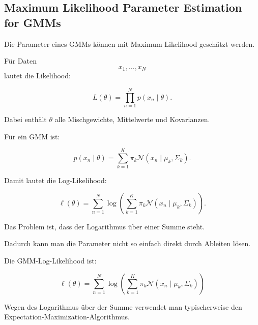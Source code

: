 \documentclass[11pt,a4paper]{scrartcl}
\begin{document}
\subsection{Maximum Likelihood Parameter Estimation for GMMs}

\begin{notebox}
    Die Parameter eines GMMs können mit Maximum Likelihood geschätzt werden.

    Für Daten
    \[
        x_1,\dots,x_N
    \]
    lautet die Likelihood:

    \[
        L(\theta)
        =
        \prod_{n=1}^{N}
        p(x_n\mid \theta).
    \]

    Dabei enthält \(\theta\) alle Mischgewichte, Mittelwerte und Kovarianzen.
\end{notebox}

\begin{calculationbox}
    Für ein GMM ist:

    \[
        p(x_n\mid \theta)
        =
        \sum_{k=1}^{K}
        \pi_k
        \mathcal{N}(x_n\mid \mu_k,\Sigma_k).
    \]

    Damit lautet die Log-Likelihood:

    \[
        \ell(\theta)
        =
        \sum_{n=1}^{N}
        \log
        \left(
            \sum_{k=1}^{K}
            \pi_k
            \mathcal{N}(x_n\mid \mu_k,\Sigma_k)
        \right).
    \]

    Das Problem ist, dass der Logarithmus über einer Summe steht.

    Dadurch kann man die Parameter nicht so einfach direkt durch Ableiten lösen.
\end{calculationbox}

\begin{answerbox}
    Die GMM-Log-Likelihood ist:

    \[
        \boxed{
            \ell(\theta)
            =
            \sum_{n=1}^{N}
            \log
            \left(
                \sum_{k=1}^{K}
                \pi_k
                \mathcal{N}(x_n\mid \mu_k,\Sigma_k)
            \right)
        }
    \]

    Wegen des Logarithmus über der Summe verwendet man typischerweise den
    Expectation-Maximization-Algorithmus.
\end{answerbox}

\end{document}
